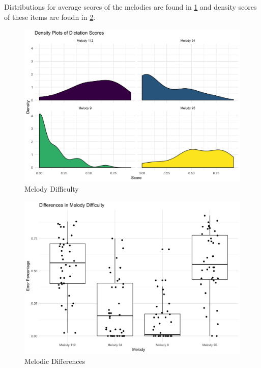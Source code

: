 \documentclass[12pt,]{book}
\begin{document}
Distributions for average scores of the melodies are found in \ref{fig:eboxplot} and density scores of these items are foudn in \ref{fig:edistribution}.

\begin{figure}

{\centering \includegraphics[width=1\linewidth]{img/melody_difficulty} 

}

\caption{Melody Difficulty}\label{fig:eboxplot}
\end{figure}

\begin{figure}

{\centering \includegraphics[width=1\linewidth]{img/melody_differences} 

}

\caption{Melodic Differences}\label{fig:edistribution}
\end{figure}
\end{document}
